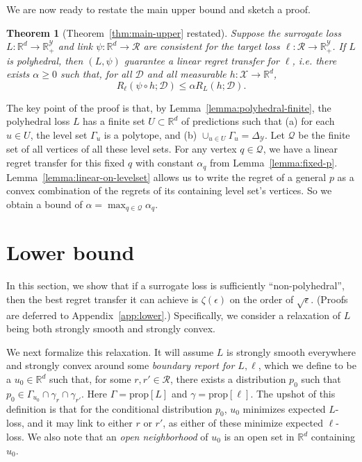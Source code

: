 \documentclass{article}
\newtheorem{theorem}{Theorem}
\theoremstyle{definition}\newtheorem{definition}{Definition}
\theoremstyle{definition}\newtheorem{assumption}{Assumption}
\newcommand{\reals}{\mathbb{R}}
\newcommand{\prop}[1]{\mathrm{prop}[#1]}
\newcommand{\simplex}{\Delta_\Y}
\newcommand{\D}{\mathcal{D}}
\newcommand{\R}{\mathcal{R}}
\newcommand{\X}{\mathcal{X}}
\newcommand{\Y}{\mathcal{Y}}
\begin{document}
We are now ready to restate the main upper bound and sketch a proof.
\begin{theorem}[Theorem~\ref{thm:main-upper} restated] \label{thm:main-upper-details}
  Suppose the surrogate loss $L: \reals^d \to \reals_+^{\Y}$ and link $\psi: \reals^d \to \R$ are consistent for the target loss $\ell: \R \to \reals_+^{\Y}$.
  If $L$ is polyhedral, then $(L,\psi)$ guarantee a linear regret transfer for $\ell$, i.e. there exists $\alpha \geq 0$ such that, for all $\D$ and all measurable $h: \X \to \reals^d$,
    \[ R_{\ell}(\psi \circ h ; \D) \leq \alpha R_L(h ; \D) . \]
\end{theorem}
The key point of the proof is that, by Lemma~\ref{lemma:polyhedral-finite}, the polyhedral loss $L$ has a finite set $U \subset \reals^d$ of predictions such that (a) for each $u \in U$, the level set $\Gamma_u$ is a polytope, and (b) $\cup_{u \in U} \Gamma_u = \simplex$.
Let $\mathcal{Q}$ be the finite set of all vertices of all these level sets.
For any vertex $q \in \mathcal{Q}$, we have a linear regret transfer for this fixed $q$ with constant $\alpha_q$ from Lemma~\ref{lemma:fixed-p}.
Lemma~\ref{lemma:linear-on-levelset} allows us to write the regret of a general $p$ as a convex combination of the regrets of its containing level set's vertices.
So we obtain a bound of $\alpha = \max_{q \in \mathcal{Q}} \alpha_q$.


\section{Lower bound} \label{sec:lower}

In this section, we show that if a surrogate loss is sufficiently ``non-polyhedral'', then the best regret transfer it can achieve is $\zeta(\epsilon)$ on the order of $\sqrt{\epsilon}$.
(Proofs are deferred to Appendix~\ref{app:lower}.)
Specifically, we consider a relaxation of $L$ being both strongly smooth and strongly convex.

We next formalize this relaxation.
It will assume $L$ is strongly smooth everywhere and strongly convex around some \emph{boundary report for $L,\ell$}, which we define to be a $u_0 \in \reals^d$ such that, for some $r,r' \in \R$, there exists a distribution $p_0$ such that $p_0 \in \Gamma_{u_0} \cap \gamma_r \cap \gamma_{r'}$.
Here $\Gamma = \prop{L}$ and $\gamma = \prop{\ell}$.
The upshot of this definition is that for the conditional distribution $p_0$, $u_0$ minimizes expected $L$-loss, and it may link to either $r$ or $r'$, as either of these minimize expected $\ell$-loss.
We also note that an \emph{open neighborhood} of $u_0$ is an open set in $\reals^d$ containing $u_0$.
\end{document}
